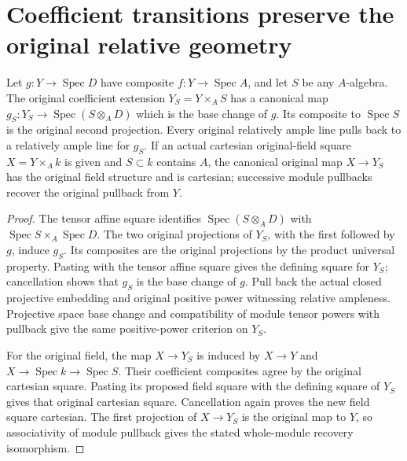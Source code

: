 \section{Coefficient transitions preserve the original relative geometry}

\begin{lemma}
\label{lem:kn-relative-arithmetic-scalar-transition}
\leanok
Let $g:Y\to\operatorname{Spec}D$ have composite
$f:Y\to\operatorname{Spec}A$, and let $S$ be any $A$-algebra.
The original coefficient extension
$Y_S=Y\times_A S$ has a canonical map
$g_S:Y_S\to\operatorname{Spec}(S\otimes_A D)$ which is the base
change of $g$.  Its composite to $\operatorname{Spec}S$ is the
original second projection.  Every original relatively ample line
pulls back to a relatively ample line for $g_S$.  If an actual
cartesian original-field square $X=Y\times_A k$ is given and
$S\subset k$ contains $A$, the canonical original map
$X\to Y_S$ has the original field structure and is cartesian;
successive module pullbacks recover the original pullback from $Y$.
\end{lemma}
\begin{proof}
The tensor affine square identifies
$\operatorname{Spec}(S\otimes_A D)$ with
$\operatorname{Spec}S\times_A\operatorname{Spec}D$.
The two original projections of $Y_S$, with the first followed by
$g$, induce $g_S$.  Its composites are the original projections by
the product universal property.  Pasting with the tensor affine
square gives the defining square for $Y_S$; cancellation shows
that $g_S$ is the base change of $g$.  Pull back the actual closed
projective embedding and original positive power witnessing
relative ampleness.  Projective space base change and compatibility
of module tensor powers with pullback give the same positive-power
criterion on $Y_S$.

For the original field, the map $X\to Y_S$ is induced by
$X\to Y$ and $X\to\operatorname{Spec}k\to\operatorname{Spec}S$.
Their coefficient composites agree by the original cartesian
square.  Pasting its proposed field square with the defining square
of $Y_S$ gives that original cartesian square.  Cancellation again
proves the new field square cartesian.  The first projection of
$X\to Y_S$ is the original map to $Y$, so associativity of module
pullback gives the stated whole-module recovery isomorphism.
\end{proof}
